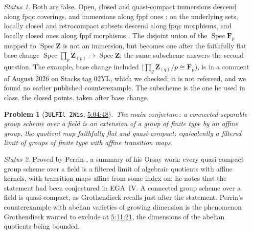 \documentclass[11pt,a4paper]{amsart}
\newtheorem{problem}{Problem}
\theoremstyle{definition}
\theoremstyle{remark}
\newtheorem*{status}{Status}
\newcommand{\q}[1]{\guillemotleft\,#1\,\guillemotright}
\newcommand{\ts}[3]{\href{https://www.youtube.com/watch?v=#1&t=#2}{#3}}
\begin{document}
\begin{status}
Both are false. Open, closed and quasi-compact immersions descend along fpqc coverings, and immersions along fppf ones \cite[02L3, 02L6, 02L8, 02YM]{stacks}; on the underlying sets, locally closed and retrocompact subsets descend along fpqc morphisms, and locally closed ones along fppf morphisms \cite[Thms~4.1, 4.2]{rydh}. The disjoint union of the $\operatorname{Spec}\mathbf F_p$ mapped to $\operatorname{Spec}\mathbf Z$ is not an immersion, but becomes one after the faithfully flat base change $\operatorname{Spec}\prod_p\mathbf Z_{(p)}\to\operatorname{Spec}\mathbf Z$; the same subscheme answers the second question. The example, base change included ($\prod_q\mathbf Z_{(q)}/p\cong\mathbf F_p$), is in a comment of August 2026 on Stacks tag 02YL, which we checked; it is not refereed, and we found no earlier published counterexample. The subscheme is the one he used in class, the closed points, taken after base change.
\end{status}

\begin{problem}[\texttt{3ULFIl\_2Wis}, \ts{3ULFIl_2Wis}{5h4m48s}{5:04:48}]\label{p:perrin}
\q{The main conjecture}: a connected separable group scheme over a field is an extension of a group of finite type by an affine group, the quotient map faithfully flat and quasi-compact; equivalently a filtered limit of groups of finite type with affine transition maps.
\end{problem}
\begin{status}
Proved by Perrin \cite{perrin}, a summary of his Orsay work: every quasi-compact group scheme over a field is a filtered limit of algebraic quotients with affine kernels, with transition maps affine from some index on; he notes that the statement had been conjectured in EGA~IV. A connected group scheme over a field is quasi-compact, as Grothendieck recalls just after the statement. Perrin's counterexample with abelian varieties of growing dimension is the phenomenon Grothendieck wanted to exclude at \ts{3ULFIl_2Wis}{5h11m21s}{5:11:21}, the dimensions of the abelian quotients being bounded.
\end{status}
\end{document}
